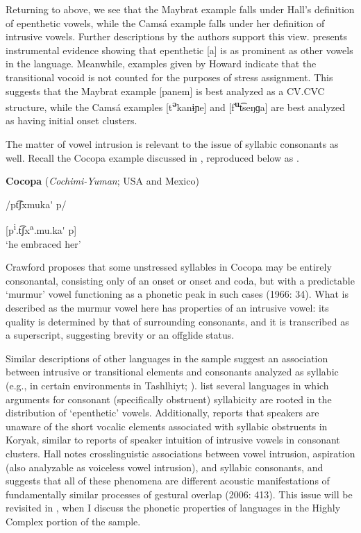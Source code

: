   Returning to  above, we see that the Maybrat example falls under Hall’s definition of epenthetic vowels, while the Camsá example falls under her definition of intrusive vowels. Further descriptions by the authors support this view. \citet[36]{Dol2007} presents instrumental evidence showing that epenthetic [a] is as prominent as other vowels in the language. Meanwhile, examples given by Howard indicate that the transitional vocoid is not counted for the purposes of stress assignment. This suggests that the Maybrat example [panem] is best analyzed as a CV.CVC structure, while the Camsá examples [t\textbf{\textsuperscript{ə}}kanɨɲe] and [f\textbf{\textsuperscript{u}}t͡seŋɡa] are best analyzed as having initial onset clusters.

  The matter of vowel intrusion is relevant to the issue of syllabic consonants as well. Recall the Cocopa example discussed in , reproduced below as .

\ea\label{ex:3.10}
  \textbf{Cocopa} (\textit{Cochimi-Yuman}; USA and Mexico)

/pt͡ʃxmuka\'{} p/

[p\textsuperscript{i}.t͡ʃx\textsuperscript{a}.mu.ka\'{} p]\\
\glt ‘he embraced her’
\citep[43]{Crawford1966}
\z

Crawford proposes that some unstressed syllables in Cocopa may be entirely consonantal, consisting only of an onset or onset and coda, but with a predictable ‘murmur’ vowel functioning as a phonetic peak in such cases (1966: 34). What is described as the murmur vowel here has properties of an intrusive vowel: its quality is determined by that of surrounding consonants, and it is transcribed as a superscript, suggesting brevity or an offglide status.

  Similar descriptions of other languages in the sample suggest an association between intrusive or transitional elements and consonants analyzed as syllabic (e.g., in certain environments in Tashlhiyt; \citealt{DellElmedlaoui2002}). \citet{HargusBeavert2006} list several languages in which arguments for consonant (specifically obstruent) syllabicity are rooted in the distribution of ‘epenthetic’ vowels. Additionally, \citet[185-6]{Bell1978a} reports that speakers are unaware of the short vocalic elements associated with syllabic obstruents in Koryak, similar to reports of speaker intuition of intrusive vowels in consonant clusters. Hall notes crosslinguistic associations between vowel intrusion, aspiration (also analyzable as voiceless vowel intrusion), and syllabic consonants, and suggests that all of these phenomena are different acoustic manifestations of fundamentally similar processes of gestural overlap (2006: 413). This issue will be revisited in , when I discuss the phonetic properties of languages in the Highly Complex portion of the sample.

